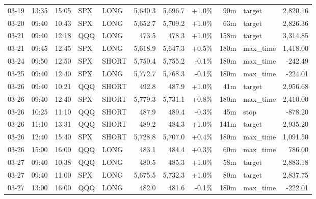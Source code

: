 \documentclass[11pt,a4paper,twoside]{article}
\begin{document}
\begin{center}
\begin{longtable}{>{\color{txtmain}}l l l l l r r r r >{\color{txtmain}}l r}
03-19 & 13:35 & 15:05 & SPX & LONG & 5,640.3 & 5,696.7 & \textcolor{wingreen}{+1.0\%} & 90m & target & \textcolor{wingreen}{2,820.16} \\
03-20 & 09:40 & 10:43 & SPX & LONG & 5,652.7 & 5,709.2 & \textcolor{wingreen}{+1.0\%} & 63m & target & \textcolor{wingreen}{2,826.36} \\
03-21 & 09:40 & 12:18 & QQQ & LONG & 473.5 & 478.3 & \textcolor{wingreen}{+1.0\%} & 158m & target & \textcolor{wingreen}{3,314.85} \\
03-21 & 09:45 & 12:45 & SPX & LONG & 5,618.9 & 5,647.3 & \textcolor{wingreen}{+0.5\%} & 180m & max\_time & \textcolor{wingreen}{1,418.00} \\
03-24 & 09:50 & 12:50 & SPX & SHORT & 5,750.4 & 5,755.2 & \textcolor{lossred}{-0.1\%} & 180m & max\_time & \textcolor{lossred}{-242.49} \\
03-25 & 09:40 & 12:40 & SPX & LONG & 5,772.7 & 5,768.3 & \textcolor{lossred}{-0.1\%} & 180m & max\_time & \textcolor{lossred}{-224.01} \\
03-26 & 09:40 & 10:21 & QQQ & SHORT & 492.8 & 487.9 & \textcolor{wingreen}{+1.0\%} & 41m & target & \textcolor{wingreen}{2,956.68} \\
03-26 & 09:40 & 12:40 & SPX & SHORT & 5,779.3 & 5,731.1 & \textcolor{wingreen}{+0.8\%} & 180m & max\_time & \textcolor{wingreen}{2,410.00} \\
03-26 & 10:25 & 11:10 & QQQ & SHORT & 487.9 & 489.4 & \textcolor{lossred}{-0.3\%} & 45m & stop & \textcolor{lossred}{-878.20} \\
03-26 & 11:10 & 13:31 & QQQ & SHORT & 489.2 & 484.3 & \textcolor{wingreen}{+1.0\%} & 141m & target & \textcolor{wingreen}{2,935.20} \\
03-26 & 12:40 & 15:40 & SPX & SHORT & 5,728.8 & 5,707.0 & \textcolor{wingreen}{+0.4\%} & 180m & max\_time & \textcolor{wingreen}{1,091.50} \\
03-26 & 15:00 & 16:00 & QQQ & LONG & 483.1 & 484.4 & \textcolor{wingreen}{+0.3\%} & 60m & max\_time & \textcolor{wingreen}{786.00} \\
03-27 & 09:40 & 10:38 & QQQ & LONG & 480.5 & 485.3 & \textcolor{wingreen}{+1.0\%} & 58m & target & \textcolor{wingreen}{2,883.18} \\
03-27 & 09:40 & 11:00 & SPX & LONG & 5,675.5 & 5,732.3 & \textcolor{wingreen}{+1.0\%} & 80m & target & \textcolor{wingreen}{2,837.75} \\
03-27 & 13:00 & 16:00 & QQQ & LONG & 482.0 & 481.6 & \textcolor{lossred}{-0.1\%} & 180m & max\_time & \textcolor{lossred}{-222.01} \\

\end{longtable}
\end{center}
\end{document}
